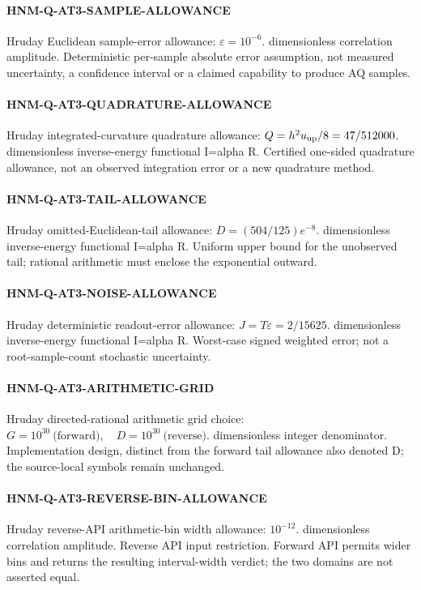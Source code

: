 \paragraph{HNM-Q-AT3-SAMPLE-ALLOWANCE} Hruday Euclidean sample-error allowance: $\varepsilon=10^{-6}$. dimensionless correlation amplitude. Deterministic per-sample absolute error assumption, not measured uncertainty, a confidence interval or a claimed capability to produce AQ samples.
\paragraph{HNM-Q-AT3-QUADRATURE-ALLOWANCE} Hruday integrated-curvature quadrature allowance: $Q=h^2u_{\rm up}/8=47/512000$. dimensionless inverse-energy functional I=alpha R. Certified one-sided quadrature allowance, not an observed integration error or a new quadrature method.
\paragraph{HNM-Q-AT3-TAIL-ALLOWANCE} Hruday omitted-Euclidean-tail allowance: $D=(504/125)e^{-8}$. dimensionless inverse-energy functional I=alpha R. Uniform upper bound for the unobserved tail; rational arithmetic must enclose the exponential outward.
\paragraph{HNM-Q-AT3-NOISE-ALLOWANCE} Hruday deterministic readout-error allowance: $J=T\varepsilon=2/15625$. dimensionless inverse-energy functional I=alpha R. Worst-case signed weighted error; not a root-sample-count stochastic uncertainty.
\paragraph{HNM-Q-AT3-ARITHMETIC-GRID} Hruday directed-rational arithmetic grid choice: $G=10^{30}\ \text{(forward)},\quad D=10^{30}\ \text{(reverse)}$. dimensionless integer denominator. Implementation design, distinct from the forward tail allowance also denoted D; the source-local symbols remain unchanged.
\paragraph{HNM-Q-AT3-REVERSE-BIN-ALLOWANCE} Hruday reverse-API arithmetic-bin width allowance: $10^{-12}$. dimensionless correlation amplitude. Reverse API input restriction. Forward API permits wider bins and returns the resulting interval-width verdict; the two domains are not asserted equal.
